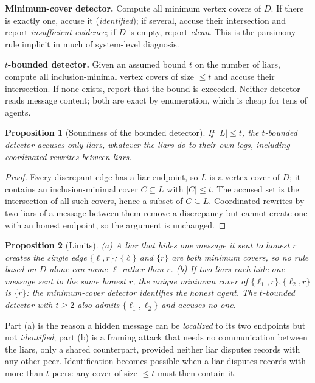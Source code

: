 \documentclass[10pt]{article}
\newtheorem{proposition}{Proposition}
\begin{document}
\textbf{Minimum-cover detector.} Compute all minimum vertex covers of $D$. If there is exactly one, accuse it
(\emph{identified}); if several, accuse their intersection and report \emph{insufficient evidence}; if $D$ is
empty, report \emph{clean}. This is the parsimony rule implicit in much of system-level diagnosis.

\textbf{$t$-bounded detector.} Given an assumed bound $t$ on the number of liars, compute all inclusion-minimal
vertex covers of size $\le t$ and accuse their intersection. If none exists, report that the bound is exceeded.
Neither detector reads message content; both are exact by enumeration, which is cheap for tens of agents.

\begin{proposition}[Soundness of the bounded detector]\label{prop:sound}
If $|L| \le t$, the $t$-bounded detector accuses only liars, whatever the liars do to their own logs, including
coordinated rewrites between liars.
\end{proposition}
\begin{proof}
Every discrepant edge has a liar endpoint, so $L$ is a vertex cover of $D$; it contains an inclusion-minimal
cover $C \subseteq L$ with $|C| \le t$. The accused set is the intersection of all such covers, hence a subset of
$C \subseteq L$. Coordinated rewrites by two liars of a message between them remove a discrepancy but cannot
create one with an honest endpoint, so the argument is unchanged.
\end{proof}

\begin{proposition}[Limits]\label{prop:limits}
(a) A liar that hides one message it sent to honest $r$ creates the single edge $\{\ell, r\}$; $\{\ell\}$ and $\{r\}$
are both minimum covers, so no rule based on $D$ alone can name $\ell$ rather than $r$.
(b) If two liars each hide one message sent to the same honest $r$, the unique minimum cover of
$\{\ell_1,r\},\{\ell_2,r\}$ is $\{r\}$: the minimum-cover detector \emph{identifies the honest agent}. The
$t$-bounded detector with $t\ge 2$ also admits $\{\ell_1,\ell_2\}$ and accuses no one.
\end{proposition}
Part (a) is the reason a hidden message can be \emph{localized} to its two endpoints but not \emph{identified};
part (b) is a framing attack that needs no communication between the liars, only a shared counterpart,
provided neither liar disputes records with any other peer.
Identification becomes possible when a liar disputes records with more than $t$ peers: any cover of size $\le t$
must then contain it.
\end{document}
